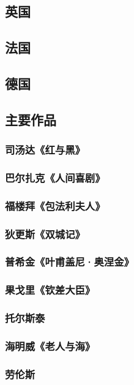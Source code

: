 \documentclass[UTF8]{../RepresentationUniverse}
\begin{document}
\subsection{英国}

\subsection{法国}

\subsection{德国}

\subsection{主要作品}

\subsubsection{司汤达《红与黑》}
\subsubsection{巴尔扎克《人间喜剧》}
\subsubsection{福楼拜《包法利夫人》}
\subsubsection{狄更斯《双城记》}
\subsubsection{普希金《叶甫盖尼·奥涅金》}
\subsubsection{果戈里《钦差大臣》}
\subsubsection{托尔斯泰}
\subsubsection{海明威《老人与海》}
\subsubsection{劳伦斯}
\end{document}
